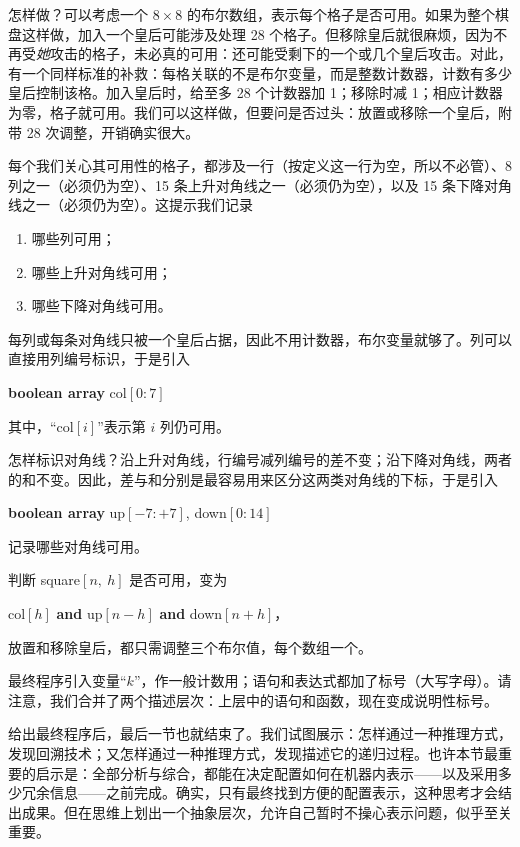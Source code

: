 \documentclass[twoside,11pt,fontset=none]{ctexbook}
\begin{document}
怎样做？可以考虑一个 $8\times 8$ 的布尔数组，表示每个格子是否可用。如果为整个棋盘这样做，加入一个皇后可能涉及处理 28 个格子。但移除皇后就很麻烦，因为不再受\textit{她}攻击的格子，未必真的可用：还可能受剩下的一个或几个皇后攻击。对此，有一个同样标准的补救：每格关联的不是布尔变量，而是整数计数器，计数有多少皇后控制该格。加入皇后时，给至多 28 个计数器加 1；移除时减 1；相应计数器为零，格子就可用。我们可以这样做，但要问是否过头：放置或移除一个皇后，附带 28 次调整，开销确实很大。

每个我们关心其可用性的格子，都涉及一行（按定义这一行为空，所以不必管）、8 列之一（必须仍为空）、15 条上升对角线之一（必须仍为空），以及 15 条下降对角线之一（必须仍为空）。这提示我们记录

\begin{enumerate}[wide, nosep, label=(\arabic*)]
	\item 哪些列可用；
	\item 哪些上升对角线可用；
	\item 哪些下降对角线可用。
\end{enumerate}

每列或每条对角线只被一个皇后占据，因此不用计数器，布尔变量就够了。列可以直接用列编号标识，于是引入

\textbf{boolean array} col$[0:7]$

\noindent
其中，“col$[i]$”表示第 $i$ 列仍可用。

怎样标识对角线？沿上升对角线，行编号减列编号的差不变；沿下降对角线，两者的和不变。因此，差与和分别是最容易用来区分这两类对角线的下标，于是引入

\quad \textbf{boolean array} up$[-7:+7]$, down$[0:14]$

\noindent
记录哪些对角线可用。

判断 square$[n,\ h]$ 是否可用，变为

\quad col$[h]$ \textbf{and} up$[n-h]$ \textbf{and} down$[n+h]$，

\noindent
放置和移除皇后，都只需调整三个布尔值，每个数组一个。

最终程序引入变量“$k$”，作一般计数用；语句和表达式都加了标号（大写字母）。请注意，我们合并了两个描述层次：上层中的语句和函数，现在变成说明性标号。

给出最终程序后，最后一节也就结束了。我们试图展示：怎样通过一种推理方式，发现回溯技术；又怎样通过一种推理方式，发现描述它的递归过程。也许本节最重要的启示是：全部分析与综合，都能在决定配置如何在机器内表示——以及采用多少冗余信息——之前完成。确实，只有最终找到方便的配置表示，这种思考才会结出成果。但在思维上划出一个抽象层次，允许自己暂时不操心表示问题，似乎至关重要。
\end{document}
